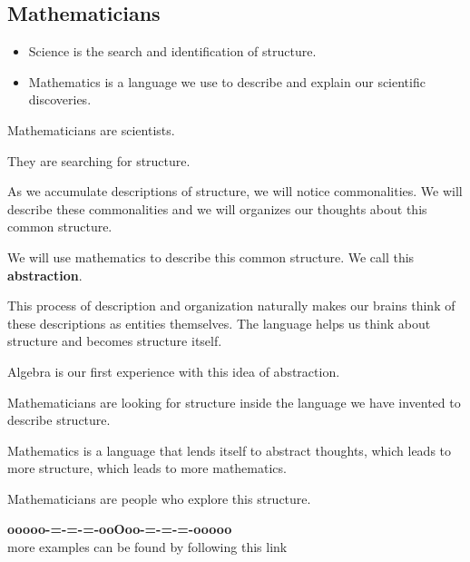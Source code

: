 \documentclass{ximera}
\begin{document}
\subsection*{Mathematicians}


\begin{itemize}
\item Science is the search and identification of structure.
\item Mathematics is a language we use to describe and explain our scientific discoveries.
\end{itemize}


Mathematicians are scientists.

They are searching for structure.


As we accumulate descriptions of structure, we will notice commonalities. We will describe these commonalities and we will organizes our thoughts about this common structure. 

We will use mathematics to describe this common structure. We call this \textbf{\textcolor{blue!55!black}{abstraction}}.

This process of description and organization naturally makes our brains think of these descriptions as entities themselves. The language helps us think about structure and becomes structure itself.

Algebra is our first experience with this idea of abstraction.

Mathematicians are looking for structure inside the language we have invented to describe structure.

Mathematics is a language that lends itself to abstract thoughts, which leads to more structure, which leads to more mathematics.

Mathematicians are people who explore this structure.








\begin{center}
\textbf{\textcolor{green!50!black}{ooooo-=-=-=-ooOoo-=-=-=-ooooo}} \\

more examples can be found by following this link\\ 

\end{center}
\end{document}

